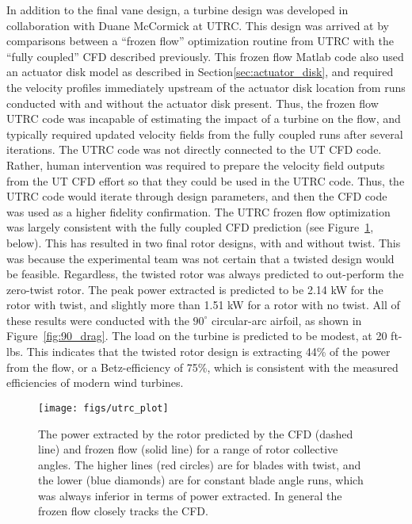 In addition to the final vane design, a turbine design was developed in
collaboration with Duane McCormick at UTRC. This design was arrived at
by comparisons between a ``frozen flow'' optimization routine from UTRC 
with the ``fully coupled'' CFD described previously. This frozen
flow Matlab code also used an actuator disk model as described in 
Section\ref{sec:actuator_disk}, and required the velocity profiles
immediately upstream of the actuator disk location from runs conducted
with and without the actuator disk present. Thus, the frozen flow
UTRC code was incapable of estimating the impact of a turbine on the
flow, and typically required updated velocity fields from the fully
coupled runs after several iterations. 
The UTRC code was not directly connected to the UT CFD code. Rather,
human intervention was required to prepare the velocity field outputs
from the UT CFD effort so that they could be used in the UTRC
code. Thus, the UTRC code would iterate through design parameters, and
then the CFD code was used as a higher fidelity confirmation. The UTRC
frozen flow optimization was largely consistent with the fully coupled
CFD prediction (see  Figure~\ref{fig:UTRC_turbine}, below). This has
resulted in two final rotor designs, with and without twist. This was
because the experimental team was not certain that a twisted design
would be feasible. Regardless, the twisted rotor was always predicted to 
out-perform the zero-twist rotor.  
The peak power extracted is predicted to be 2.14 kW for the rotor
with twist, and slightly more than 1.51 kW for a rotor with no twist. 
All of these results were conducted with the $90^{\circ}$ circular-arc
airfoil, as shown in Figure~\ref{fig:90_drag}. The load on the turbine
is predicted to be modest, at 20 ft-lbs. This indicates that the twisted
rotor design is extracting 44\% of the power from the flow, or a
Betz-efficiency of 75\%, which is consistent with the measured
efficiencies of modern wind turbines. 

  \begin{figure}[!htb]
   \begin{center}
    \texttt{[image: figs/utrc\_plot]}
    \caption{The power extracted by the rotor predicted by the CFD
    (dashed line) and frozen flow (solid line) for a range of rotor
    collective angles. The higher lines (red circles) are for blades
    with twist, and the lower (blue diamonds) are for constant blade
    angle runs, which was always  inferior in terms of power
    extracted. In general the frozen flow closely tracks the CFD.}
    \label{fig:UTRC_turbine}
   \end{center}
  \end{figure}

